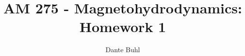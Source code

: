 \documentclass{article}
\begin{document}
\title{AM 275 - Magnetohydrodynamics: Homework 1}
\author{Dante Buhl}


\newcommand{\wrms}{w_{\text{rms}}}
\newcommand{\bs}[1]{\boldsymbol{#1}}
\newcommand{\tb}[1]{\textbf{#1}}
\newcommand{\bmp}[1]{\begin{minipage}{#1\textwidth}}
\newcommand{\emp}{\end{minipage}}
\newcommand{\R}{\mathbb{R}}
\newcommand{\C}{\mathbb{C}}
\newcommand{\N}{\mathcal{N}}
\newcommand{\K}{\bs{\mathrm{K}}}
\newcommand{\m}{\bs{\mu}_*}
\newcommand{\s}{\bs{\Sigma}_*}
\newcommand{\dt}{\Delta t}
\newcommand{\dx}{\Delta x}
\newcommand{\tr}[1]{\text{Tr}(#1)}
\newcommand{\Tr}[1]{\text{Tr}(#1)}
\newcommand{\Div}{\nabla \cdot}
\renewcommand{\div}{\nabla \cdot}
\newcommand{\Curl}{\nabla \times}
\newcommand{\Grad}{\nabla}
\newcommand{\grad}{\nabla}
\newcommand{\grads}{\nabla_s}
\newcommand{\gradf}{\nabla_f}
\newcommand{\xs}{x_s}
\newcommand{\xf}{x_f}
\newcommand{\ts}{t_s}
\newcommand{\tf}{t_f}
\newcommand{\pt}{\partial t}
\newcommand{\pz}{\partial z}
\newcommand{\uvec}{\bs{u}}
\newcommand{\F}{\bs{F}}
\newcommand{\T}{\tilde{T}}
\newcommand{\ez}{\bs{e}_z}
\newcommand{\ex}{\bs{e}_x}
\newcommand{\ey}{\bs{e}_y}
\newcommand{\eo}{\bs{e}_{\bs{\Omega}}}
\newcommand{\ppt}[1]{\frac{\partial #1}{\partial t}}
\newcommand{\DDt}[1]{\frac{D #1}{D t}}
\newcommand{\ppts}[1]{\frac{\partial #1}{\partial t_s}}
\newcommand{\pptf}[1]{\frac{\partial #1}{\partial t_f}}
\newcommand{\ppz}[1]{\frac{\partial #1}{\partial z}}
\newcommand{\ddz}[1]{\frac{d #1}{d z}}
\newcommand{\ppzetas}[1]{\frac{\partial^2 #1}{\partial \zeta^2}}
\newcommand{\ppzs}[1]{\frac{\partial #1}{\partial z_s}}
\newcommand{\ppzf}[1]{\frac{\partial #1}{\partial z_f}}
\newcommand{\ppx}[1]{\frac{\partial #1}{\partial x}}
\newcommand{\ppxi}[1]{\frac{\partial #1}{\partial x_i}}
\newcommand{\ppxj}[1]{\frac{\partial #1}{\partial x_j}}
\newcommand{\ppxm}[1]{\frac{\partial #1}{\partial x_m}}
\newcommand{\ppy}[1]{\frac{\partial #1}{\partial y}}
\newcommand{\ppzeta}[1]{\frac{\partial #1}{\partial \zeta}}


\maketitle 
\setlength{\parindent}{0pt}

\section{}
\end{document}
